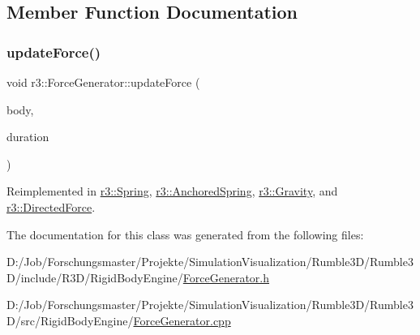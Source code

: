 \subsection{Member Function Documentation}
\mbox{\label{classr3_1_1_force_generator_a16d1e8aa85d574013de859b95944c5bb}} 
\subsubsection{\texorpdfstring{update\+Force()}{updateForce()}}
{\footnotesize\ttfamily void r3\+::\+Force\+Generator\+::update\+Force (\begin{DoxyParamCaption}\item[{\mbox{\hyperlink{classr3_1_1_rigid_body}{Rigid\+Body}} $\ast$}]{body,  }\item[{\mbox{\hyperlink{namespacer3_ab2016b3e3f743fb735afce242f0dc1eb}{real}}}]{duration }\end{DoxyParamCaption})\hspace{0.3cm}{\ttfamily [virtual]}}



Reimplemented in \mbox{\hyperlink{classr3_1_1_spring_a3305adfd568606ed9ae6fb589f20446b}{r3\+::\+Spring}}, \mbox{\hyperlink{classr3_1_1_anchored_spring_a3e928bc7fdedc8eb5b302a007200a58c}{r3\+::\+Anchored\+Spring}}, \mbox{\hyperlink{classr3_1_1_gravity_ae3152c6a922ffa193aee362e161cd4a9}{r3\+::\+Gravity}}, and \mbox{\hyperlink{classr3_1_1_directed_force_ac723ddeef767956d16fb9d0a1d706bfd}{r3\+::\+Directed\+Force}}.



The documentation for this class was generated from the following files\+:\begin{DoxyCompactItemize}
\item 
D\+:/\+Job/\+Forschungsmaster/\+Projekte/\+Simulation\+Visualization/\+Rumble3\+D/\+Rumble3\+D/include/\+R3\+D/\+Rigid\+Body\+Engine/\mbox{\hyperlink{_force_generator_8h}{Force\+Generator.\+h}}\item 
D\+:/\+Job/\+Forschungsmaster/\+Projekte/\+Simulation\+Visualization/\+Rumble3\+D/\+Rumble3\+D/src/\+Rigid\+Body\+Engine/\mbox{\hyperlink{_force_generator_8cpp}{Force\+Generator.\+cpp}}\end{DoxyCompactItemize}
